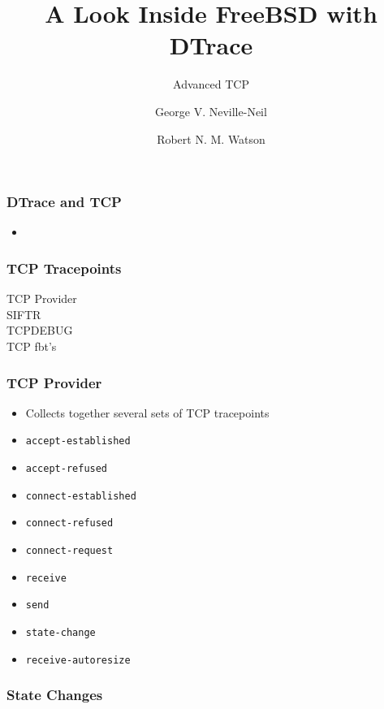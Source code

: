 \documentclass[pdftex]{beamer}
\begin{document}

\title{A Look Inside FreeBSD with DTrace}
\subtitle{Advanced TCP}
\author[shortname]{George V. Neville-Neil \and Robert N. M. Watson}

\begin{frame}
  \frametitle{DTrace and TCP}
  \begin{itemize}
  \item 
  \end{itemize}
\end{frame}

\begin{frame}
  \frametitle{TCP Tracepoints}
  \begin{description}
  \item[TCP Provider] 
  \item[SIFTR]
  \item[TCPDEBUG]
  \item[TCP fbt's] 
\end{description}
\end{frame}

\begin{frame}[fragile]
  \frametitle{TCP Provider}
  \begin{itemize}
  \item Collects together several sets of TCP tracepoints
  \end{itemize}
  \begin{itemize}
  \item \verb|accept-established|
  \item \verb|accept-refused| 
  \item \verb|connect-established|  
  \item \verb|connect-refused|  
  \item \verb|connect-request|  
  \item \verb|receive|  
  \item \verb|send|  
  \item \verb|state-change|  
  \item \verb|receive-autoresize|  
  \end{itemize}
\end{frame}

\begin{frame}
  \frametitle{State Changes}
  
\end{frame}
\end{document}
